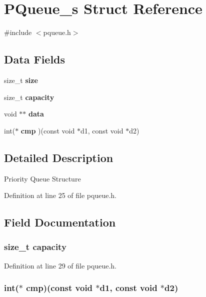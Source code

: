 \section{P\-Queue\-\_\-s Struct Reference}
\label{struct_p_queue__s}


{\ttfamily \#include $<$pqueue.\-h$>$}

\subsection*{Data Fields}
\begin{DoxyCompactItemize}
\item 
size\-\_\-t {\bf size}
\item 
size\-\_\-t {\bf capacity}
\item 
void $\ast$$\ast$ {\bf data}
\item 
int($\ast$ {\bf cmp} )(const void $\ast$d1, const void $\ast$d2)
\end{DoxyCompactItemize}


\subsection{Detailed Description}
Priority Queue Structure 

Definition at line 25 of file pqueue.\-h.



\subsection{Field Documentation}
\subsubsection[{capacity}]{\setlength{\rightskip}{0pt plus 5cm}size\-\_\-t {\bf capacity}}\label{struct_p_queue__s_ad721fc6ca6a3d6ba3bc506576622aab0}


Definition at line 29 of file pqueue.\-h.

\subsubsection[{cmp}]{\setlength{\rightskip}{0pt plus 5cm}int($\ast$ {\bf cmp})(const void $\ast$d1, const void $\ast$d2)}\label{struct_p_queue__s_ae2e17528166f735db1a678cc942a0432}


